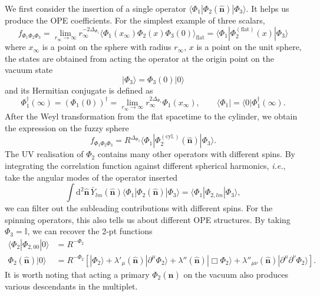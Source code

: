 \documentclass{timesjhep}
\begin{document}
We first consider the insertion of a single operator $\langle\Phi_1|\Phi_2(\hat{\mathbf{n}})|\Phi_3\rangle$. It helps us produce the OPE coefficients. For the simplest example of three scalars, \begin{equation} f_{\Phi_1\Phi_2\Phi_3}=\lim_{r_\infty\to\infty}r_\infty^{-2\Delta_{\Phi_1}}\langle \Phi_1(x_\infty)\Phi_2(x)\Phi_3(0)\rangle_\textrm{flat}=\langle\Phi_1|\Phi_2^{(\textrm{flat})}(x)|\Phi_3\rangle \end{equation} where $x_\infty$ is a point on the sphere with radius $r_\infty$, $x$ is a point on the unit sphere, the states are obtained from acting the operator at the origin point on the vacuum state
\begin{equation}
    |\Phi_3\rangle=\Phi_3(0)|0\rangle
\end{equation}
and its Hermitian conjugate is defined as
\begin{equation}
    \Phi_1^\dagger(\infty)=(\Phi_1(0))^\dagger=\lim_{r_\infty\to\infty}r_\infty^{2\Delta_{\Phi_1}}\Phi_1(x_\infty),\qquad\langle\Phi_1|=\langle0|\Phi_1^\dagger(\infty).
\end{equation}
After the Weyl transformation from the flat spacetime to the cylinder, we obtain the expression on the fuzzy sphere
\begin{equation}
    f_{\Phi_1\Phi_2\Phi_3}=R^{\Delta_{\Phi_2}}\langle\Phi_1|\Phi^{(\textrm{cyl.})}_2(\hat{\mathbf{n}})|\Phi_3\rangle.
\end{equation}
The UV realisation of $\Phi_2$ contains many other operators with different spins. By integrating the correlation function against different spherical harmonics, \textit{i.e.}, take the angular modes of the operator inserted
\begin{equation}
    \int\mathrm{d}^2\hat{\mathbf{n}}\,\bar{Y}_{lm}(\hat{\mathbf{n}})\langle\Phi_1|\Phi_2(\hat{\mathbf{n}})|\Phi_3\rangle=\langle\Phi_1|\Phi_{2,lm}|\Phi_3\rangle,
\end{equation}
we can filter out the subleading contributions with different spins. For the spinning operators, this also tells us about different OPE structures. By taking $\Phi_3=\mathbb{I}$, we can recover the 2-pt functions
\begin{align}
    \langle\Phi_2|\Phi_{2,00}|0\rangle&=R^{-\Phi_2}\nonumber\\
    \Phi_2(\hat{\mathbf{n}})|0\rangle&=R^{-\Phi_2}\left[|\Phi_2\rangle+\lambda'_\mu(\hat{\mathbf{n}})|\partial^\mu\Phi_2\rangle+\lambda''(\hat{\mathbf{n}})|\Box\Phi_2\rangle+\lambda''_{\mu\nu}(\hat{\mathbf{n}})|\partial^\mu\partial^\nu\Phi_2\rangle\right].
\end{align}
It is worth noting that acting a primary $\Phi_2(\hat{\mathbf{n}})$ on the vacuum also produces various descendants in the multiplet.
\end{document}
